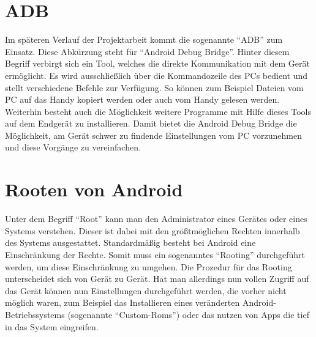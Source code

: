 \begin{flushleft}
\section{ADB}
Im späteren Verlauf der Projektarbeit kommt die sogenannte ``ADB'' zum Einsatz. Diese Abkürzung steht für ``Android Debug Bridge''. Hinter diesem Begriff verbirgt sich ein Tool, welches die direkte Kommunikation mit dem Gerät ermöglicht. Es wird ausschließlich über die Kommandozeile des PCs bedient und stellt verschiedene Befehle zur Verfügung. So können zum Beispiel Dateien vom PC auf das Handy kopiert werden oder auch vom Handy gelesen werden. Weiterhin besteht auch die Möglichkeit weitere Programme mit Hilfe dieses Tools auf dem Endgerät zu installieren. Damit bietet die Android Debug Bridge die Möglichkeit, am Gerät schwer zu findende Einstellungen vom PC vorzunehmen und diese Vorgänge zu vereinfachen. 

\section{Rooten von Android} 
Unter dem Begriff ``Root'' kann man den Administrator eines Gerätes oder eines Systems verstehen. Dieser ist dabei mit den größtmöglichen Rechten innerhalb des Systems ausgestattet. Standardmäßig besteht bei Android eine Einschränkung der Rechte. Somit muss ein sogenanntes ``Rooting'' durchgeführt werden, um diese Einschränkung zu umgehen. Die Prozedur für das Rooting unterscheidet sich von Gerät zu Gerät. Hat man allerdings nun vollen Zugriff auf das Gerät können nun Einstellungen durchgeführt werden, die vorher nicht möglich waren, zum Beispiel das Installieren eines veränderten Android-Betriebssystems (sogenannte ``Custom-Roms'') oder das nutzen von Apps die tief in das System eingreifen. 
\end{flushleft}

